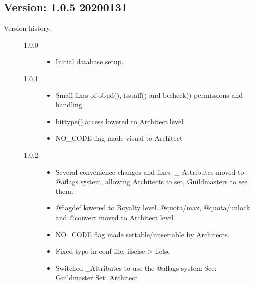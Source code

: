 \documentclass[letterpaper,10pt,english]{sphinxmanual}
\begin{document}
\subsection{Version: 1.0.5          2020\sphinxhyphen{}01\sphinxhyphen{}31}
\label{\detokenize{gettingstarted:version-1-0-5-2020-01-31}}\begin{description}
\item[{Version history:}] \leavevmode\begin{description}
\item[{1.0.0}] \leavevmode\begin{itemize}
\item {} 
\sphinxAtStartPar
Initial database setup.

\end{itemize}

\item[{1.0.1}] \leavevmode\begin{itemize}
\item {} 
\sphinxAtStartPar
Small fixes of objid(), isstaff() and bccheck() permissions and handling.

\item {} 
\sphinxAtStartPar
bittype() access lowered to Architect level

\item {} 
\sphinxAtStartPar
NO\_CODE flag made visual to Architect

\end{itemize}

\item[{1.0.2}] \leavevmode\begin{itemize}
\item {} 
\sphinxAtStartPar
Several convenience changes and fixes: \_ Attributes moved to @aflags
system, allowing Architects to set, Guildmasters to see them.

\item {} 
\sphinxAtStartPar
@flagdef lowered to Royalty level. @quota/max, @quota/unlock and @convert
moved to Architect level.

\item {} 
\sphinxAtStartPar
NO\_CODE flag made settable/unsettable by Architects.

\item {} 
\sphinxAtStartPar
Fixed typo in conf file: ifselse \sphinxhyphen{}\textgreater{} ifelse

\item {} 
\sphinxAtStartPar
Switched \_Attributes to use the @aflags system
See: Guildmaster
Set: Architect


\end{itemize}
\end{description}
\end{description}
\end{document}
